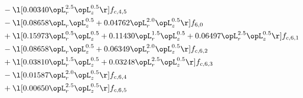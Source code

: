 \begin{alignat}{2}
& - \l[  0.00340 \opL_r^{2.5} \opL_z^{0.5}  \r] f_{c,4,5} \nonumber \\ 
& - \l[  0.08658 \opL_r \opL_z^{0.5} +  0.04762 \opL_r^{2.0} \opL_z^{0.5}  \r] f_{6,0} \nonumber \\ 
& + \l[  0.15973 \opL_r^{0.5} \opL_z^{0.5} +  0.11430 \opL_r^{1.5} \opL_z^{0.5} +  0.06497 \opL_r^{2.5} \opL_z^{0.5}  \r] f_{c,6,1} \nonumber \\ 
& - \l[  0.08658 \opL_r \opL_z^{0.5} +  0.06349 \opL_r^{2.0} \opL_z^{0.5}  \r] f_{c,6,2} \nonumber \\ 
& + \l[  0.03810 \opL_r^{1.5} \opL_z^{0.5} +  0.03248 \opL_r^{2.5} \opL_z^{0.5}  \r] f_{c,6,3} \nonumber \\ 
& - \l[  0.01587 \opL_r^{2.0} \opL_z^{0.5}  \r] f_{c,6,4} \nonumber \\ 
& + \l[  0.00650 \opL_r^{2.5} \opL_z^{0.5}  \r] f_{c,6,5} \nonumber \\ 
\end{alignat} 


